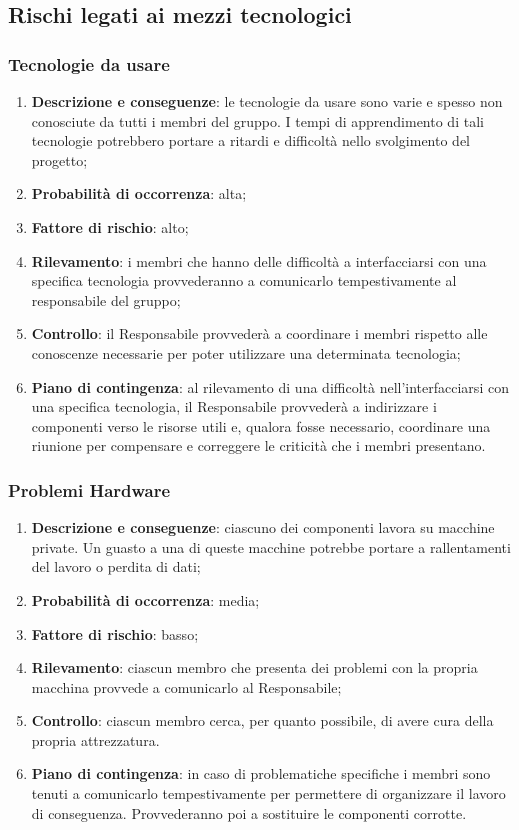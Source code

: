 \subsection{Rischi legati ai mezzi tecnologici}
	\subsubsection{Tecnologie da usare}		
	\begin{enumerate}
		\item \textbf{Descrizione e conseguenze}: le tecnologie da usare sono varie e spesso non conosciute da tutti i membri del gruppo. I tempi di apprendimento di tali tecnologie potrebbero portare a ritardi e difficoltà nello svolgimento del progetto;
		\item \textbf{Probabilità di occorrenza}: alta;
		\item \textbf{Fattore di rischio}: alto;
		\item \textbf{Rilevamento}: i membri che hanno delle difficoltà a interfacciarsi con una specifica tecnologia provvederanno a comunicarlo tempestivamente al responsabile del gruppo;
		\item \textbf{Controllo}: il Responsabile provvederà a coordinare i membri rispetto alle conoscenze necessarie per poter utilizzare una determinata tecnologia;  
		\item \textbf{Piano di contingenza}: al rilevamento di una difficoltà nell'interfacciarsi con una specifica tecnologia, il Responsabile provvederà a indirizzare i componenti verso le risorse utili e, qualora fosse necessario, coordinare una riunione per compensare e correggere le criticità che i membri presentano.
	\end{enumerate}	
	
	\subsubsection{Problemi Hardware}
	\begin{enumerate}
		\item \textbf{Descrizione e conseguenze}: ciascuno dei componenti lavora su macchine private. Un guasto a una di queste macchine potrebbe portare a rallentamenti del lavoro o perdita di dati;
		\item \textbf{Probabilità di occorrenza}: media;
		\item \textbf{Fattore di rischio}: basso;
		\item \textbf{Rilevamento}: ciascun membro che presenta dei problemi con la propria macchina provvede a comunicarlo al Responsabile;		
		\item \textbf{Controllo}: ciascun membro cerca, per quanto possibile, di avere cura della propria attrezzatura.
		\item \textbf{Piano di contingenza}: in caso di problematiche specifiche i membri sono tenuti a comunicarlo tempestivamente per permettere di organizzare il lavoro di conseguenza. Provvederanno poi a sostituire le componenti corrotte. 
	\end{enumerate}
	

